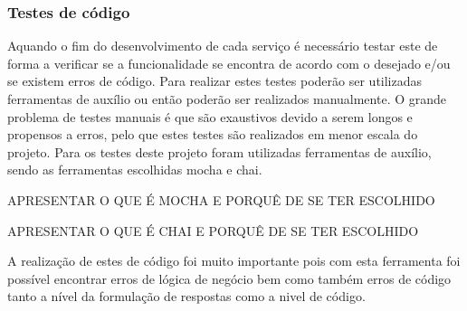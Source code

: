 \subsubsection{Testes de código}
Aquando o fim do desenvolvimento de cada serviço é necessário testar este de forma a verificar se a funcionalidade se encontra de acordo com o desejado e/ou se existem erros de código. Para realizar estes testes poderão ser utilizadas ferramentas de auxílio ou então poderão ser realizados manualmente. O grande problema de testes manuais é que são exaustivos devido a serem longos e propensos a erros, pelo que estes testes são realizados em menor escala do projeto. Para os testes deste projeto foram utilizadas ferramentas de auxílio, sendo as ferramentas escolhidas mocha e chai.

APRESENTAR O QUE É MOCHA E PORQUÊ DE SE TER ESCOLHIDO

APRESENTAR O QUE É CHAI E PORQUÊ DE SE TER ESCOLHIDO

A realização de estes de código foi muito importante pois com esta ferramenta foi possível encontrar erros de lógica de negócio bem como também erros de código tanto a nível da formulação de respostas como a nivel de código.



